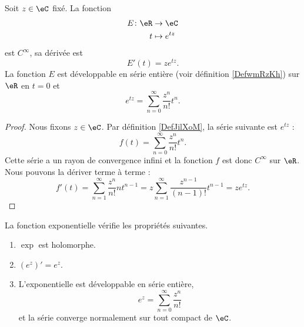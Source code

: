 \begin{proposition}
    Soit \( z\in\eC\) fixé. La fonction
    \begin{equation}
        \begin{aligned}
            E\colon \eR&\to \eC \\
            t&\mapsto  e^{tz} 
        \end{aligned}
    \end{equation}
    est  \(  C^{\infty}\), sa dérivée est 
    \begin{equation}
        E'(t)=z e^{tz}.
    \end{equation}
    La fonction \( E\) est développable en série entière (voir définition \ref{DefwmRzKh}) sur \( \eR\) en \( t=0\) et
    \begin{equation}
        e^{tz}=\sum_{n=0}^{\infty}\frac{ z^n }{ n! }t^n.
    \end{equation}
\end{proposition}

\begin{proof}
    Nous fixons \( z\in \eC\). Par définition \ref{DefJilXoM}, la série suivante est \(  e^{tz}\) :
    \begin{equation}
        f(t)=\sum_{n=0}^{\infty}\frac{ z^n }{ n! }t^n.
    \end{equation}
    Cette série a un rayon de convergence infini et la fonction \( f\) est donc \(  C^{\infty}\) sur \( \eR\). Nous pouvons la dériver terme à terme :
    \begin{equation}
            f'(t)=\sum_{n=1}^{\infty}\frac{ z^n }{ n! }nt^{n-1}
            =z\sum_{n=1}^{\infty}\frac{ z^{n-1} }{ (n-1)! }t^{n-1}
            =z e^{tz}.
    \end{equation}
\end{proof}

\begin{theorem}
    La fonction exponentielle vérifie les propriétés suivantes.
    \begin{enumerate}
        \item
            \( \exp\) est holomorphe.
        \item
            \( (e^z)'=e^z\).
        \item
            L'exponentielle est développable en série entière,
            \begin{equation}
                e^z=\sum_{n=0}^{\infty}\frac{ z^n }{ n! }
            \end{equation}
            et la série converge normalement sur tout compact de \( \eC\).
    \end{enumerate}
\end{theorem}

